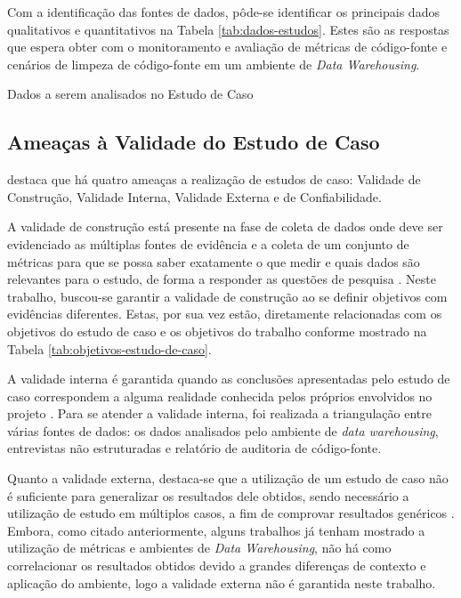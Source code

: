 Com a identificação das fontes de dados, pôde-se identificar os principais dados qualitativos e quantitativos na Tabela \ref{tab:dados-estudos}. Estes são as respostas que espera obter com o monitoramento e avaliação de métricas de código-fonte e cenários de limpeza de código-fonte em um ambiente de \textit{Data Warehousing}.

\begin{table}[H]
\begin{center}

\caption{Dados a serem analisados no Estudo de Caso}
\label{tab:dados-estudos}
\end{center}
\end{table}
\FloatBarrier

\subsection{Ameaças à Validade do Estudo de Caso}
\label{sec:validade-estudo}

 destaca que há quatro ameaças a realização de estudos de caso: Validade de Construção, Validade Interna, Validade Externa e de Confiabilidade.

A validade de construção está presente na fase de coleta de dados onde deve ser evidenciado as múltiplas fontes de evidência e a coleta de um conjunto de métricas para que se possa saber exatamente o que medir e quais dados são relevantes para o estudo, de forma a responder as questões de pesquisa \cite{yin2011applications}. Neste trabalho, buscou-se garantir a validade de construção ao se definir objetivos com evidências diferentes. Estas, por sua vez estão, diretamente relacionadas com os objetivos do estudo de caso e os objetivos do trabalho conforme mostrado na Tabela \ref{tab:objetivos-estudo-de-caso}.

A validade interna é garantida quando as conclusões apresentadas pelo estudo de caso correspondem a alguma realidade conhecida pelos próprios envolvidos no projeto \cite{yin2011applications}. Para se atender a validade interna, foi realizada a triangulação entre várias fontes de dados: os dados analisados pelo ambiente de \textit{data warehousing}, entrevistas não estruturadas e relatório de auditoria de código-fonte. 

Quanto a validade externa, destaca-se que a utilização de um estudo de caso não é suficiente para generalizar os resultados dele obtidos, sendo necessário a utilização de estudo em múltiplos casos, a fim de comprovar resultados genéricos \cite{yin2011applications}. Embora, como citado anteriormente, alguns trabalhos já tenham mostrado a utilização de métricas e ambientes de \textit{Data Warehousing}, não há como correlacionar os resultados obtidos devido a grandes diferenças de contexto e aplicação do ambiente, logo a validade externa não é garantida neste trabalho.

